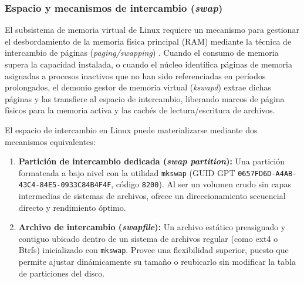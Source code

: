 \documentclass[12pt]{article}
\begin{document}
\subsubsection{Espacio y mecanismos de intercambio (\textit{swap})}

El subsistema de memoria virtual de Linux requiere un mecanismo para gestionar el desbordamiento de la memoria física principal (RAM) mediante la técnica de intercambio de páginas (\textit{paging/swapping}) \parencite[\S 12.6, pp.\ 421--423]{silberschatz2006fundamentos}. Cuando el consumo de memoria supera la capacidad instalada, o cuando el núcleo identifica páginas de memoria asignadas a procesos inactivos que no han sido referenciadas en períodos prolongados, el demonio gestor de memoria virtual (\textit{kswapd}) extrae dichas páginas y las transfiere al espacio de intercambio, liberando marcos de página físicos para la memoria activa y las cachés de lectura/escritura de archivos.

El espacio de intercambio en Linux puede materializarse mediante dos mecanismos equivalentes:
\begin{enumerate}[noitemsep, topsep=2pt]
    \item \textbf{Partición de intercambio dedicada (\textit{swap partition}):} Una partición formateada a bajo nivel con la utilidad \texttt{mkswap} (GUID GPT \texttt{0657FD6D-A4AB-43C4-84E5-0933C84B4F4F}, código \texttt{8200}). Al ser un volumen crudo sin capas intermedias de sistemas de archivos, ofrece un direccionamiento secuencial directo y rendimiento óptimo.
    \item \textbf{Archivo de intercambio (\textit{swapfile}):} Un archivo estático preasignado y contiguo ubicado dentro de un sistema de archivos regular (como ext4 o Btrfs) inicializado con \texttt{mkswap}. Provee una flexibilidad superior, puesto que permite ajustar dinámicamente su tamaño o reubicarlo sin modificar la tabla de particiones del disco.
\end{enumerate}
\end{document}
